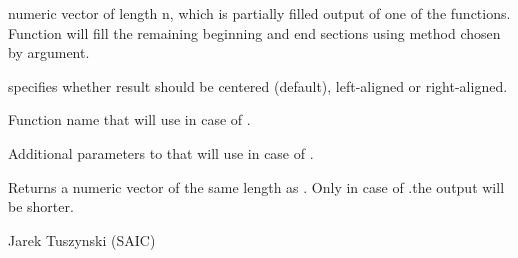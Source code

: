 \begin{Arguments}
\begin{ldescription}
\item[\code{y}] numeric vector of length n, which is partially filled output of 
one of the  functions. Function  will fill the 
remaining beginning and end sections using method chosen by  
argument.
\item[\code{align}] specifies whether result should be centered (default), 
left-aligned or right-aligned. 
\item[\code{Func}] Function name that  will use in case of 
.
\item[\code{...}] Additional parameters to  that  will 
use in case of .
\end{ldescription}
\end{Arguments}
\begin{Value}
Returns a numeric vector of the same length as . Only in case of 
.the output will be shorter.
\end{Value}
\begin{Author}\relax
Jarek Tuszynski (SAIC) 
\end{Author}

